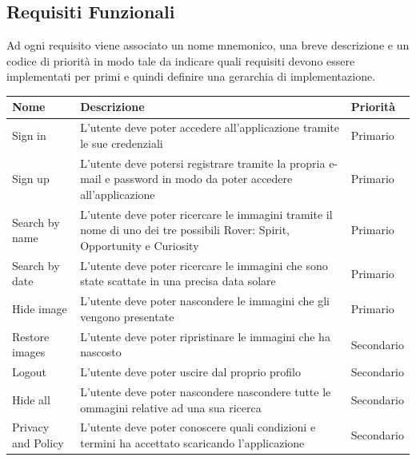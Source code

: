 \subsection{Requisiti Funzionali}

Ad ogni requisito viene associato un nome mnemonico, una breve descrizione e un codice di priorit\`a in modo tale da indicare quali requisiti devono essere implementati per primi e quindi definire una gerarchia di implementazione.
\begin{center}
    \begin{longtable}{ | l | p{7cm} | l | }
        \hline
        \textbf{Nome}      & \textbf{Descrizione }                                                                                                     & \textbf{Priorit\`a} \\ \hline
        Sign in            & L'utente deve poter accedere all'applicazione tramite le sue credenziali                                                  & Primario            \\ \hline
        Sign up            & L'utente deve potersi registrare tramite la propria e-mail e password in modo da poter accedere all'applicazione          & Primario            \\ \hline
        Search by name     & L'utente deve poter ricercare le immagini tramite il nome di uno dei tre possibili Rover: Spirit, Opportunity e Curiosity & Primario            \\ \hline
        Search by date     & L'utente deve poter ricercare le immagini che sono state scattate in una precisa data solare                              & Primario            \\ \hline
        Hide image         & L'utente deve poter nascondere le immagini che gli vengono presentate                                                     & Primario            \\ \hline
        Restore images     & L'utente deve poter ripristinare le immagini che ha nascosto                                                              & Secondario          \\ \hline
        Logout             & L'utente deve poter uscire dal proprio profilo                                                                            & Secondario          \\ \hline
        Hide all           & L'utente deve poter nascondere nascondere tutte le ommagini relative ad una sua ricerca                                   & Secondario          \\ \hline
        Privacy and Policy & L'utente deve poter conoscere quali condizioni e termini ha accettato scaricando l'applicazione                           & Secondario          \\ \hline
    \end{longtable}
\end{center}
